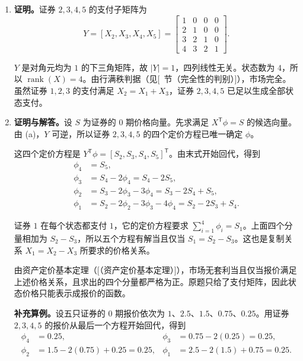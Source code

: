 \begin{solution}[blank-type=manual,blank-vsep=9\baselineskip]
\begin{enumerate}[label=(\alph*),ref=(\alph*)]
    \item \textbf{证明。}证券 $2,3,4,5$ 的支付子矩阵为
    \[
      Y=[X_2,X_3,X_4,X_5]
      =\begin{bmatrix}1&0&0&0\\2&1&0&0\\3&2&1&0\\4&3&2&1\end{bmatrix}.
    \]

    $Y$ 是对角元均为 $1$ 的下三角矩阵，故 $\lvert Y\rvert=1$，四列线性无关。状态数为 $4$，所以 $\operatorname{rank}(X)=4$。由行满秩判据\ifdefined\WJHandoutKnowledge（见[~节（完全性的判别）]）\fi，市场完全。虽然证券 $1,2,3$ 的支付满足 $X_2=X_1+X_3$，证券 $2,3,4,5$ 已足以生成全部状态支付。

    \item \textbf{证明与解答。}设 $S$ 为证券的 0 期价格向量。先求满足 $X^{\mathsf T}\phi=S$ 的候选向量。由 (a)，$Y$ 可逆，所以证券 $2,3,4,5$ 的四个定价方程已唯一确定 $\phi$。

    这四个定价方程是 $Y^{\mathsf T}\phi=[S_2,S_3,S_4,S_5]^{\mathsf T}$。由末式开始回代，得到
    \[
        \begin{aligned}
            \phi_4&=S_5,\\
            \phi_3&=S_4-2\phi_4=S_4-2S_5,\\
            \phi_2&=S_3-2\phi_3-3\phi_4=S_3-2S_4+S_5,\\
            \phi_1&=S_2-2\phi_2-3\phi_3-4\phi_4=S_2-2S_3+S_4.
        \end{aligned}
    \]

    证券 $1$ 在每个状态都支付 $1$，它的定价方程要求 $\sum_{i=1}^4\phi_i=S_1$。上面四个分量相加为 $S_2-S_3$，所以五个方程有解当且仅当 $S_1=S_2-S_3$。这也是复制关系 $X_1=X_2-X_3$ 所要求的价格关系。

    由资产定价基本定理\ifdefined\WJHandoutKnowledge（[（资产定价基本定理）]）\fi，市场无套利当且仅当报价满足上述价格关系，且求出的四个分量都严格为正。原题只给了支付矩阵，因此状态价格只能表示成报价的函数。

    \textbf{补充算例。}设五只证券的 0 期报价依次为 $1$、$2.5$、$1.5$、$0.75$、$0.25$。用证券 $2,3,4,5$ 的报价从最后一个方程开始回代，得到
    \[
        \begin{aligned}
            \phi_4&=0.25,&
            \phi_3&=0.75-2(0.25)=0.25,\\
            \phi_2&=1.5-2(0.75)+0.25=0.25,&
            \phi_1&=2.5-2(1.5)+0.75=0.25.
        \end{aligned}
    \]


\end{enumerate}
\end{solution}
